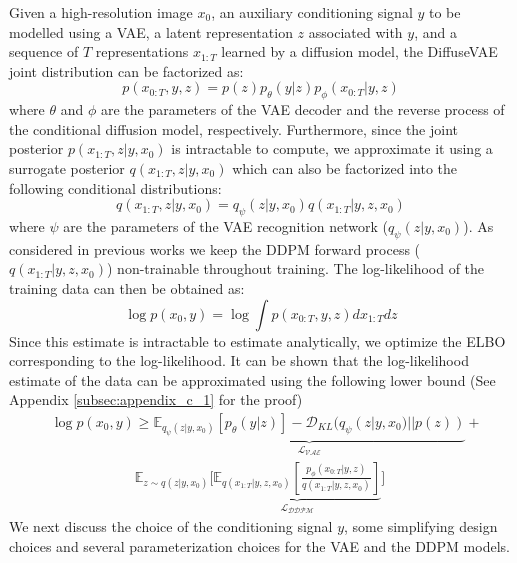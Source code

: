 \documentclass[10pt]{article} \usepackage[accepted]{tmlr}
\begin{document}
Given a high-resolution image $x_0$, an auxiliary conditioning signal $y$ to be modelled using a VAE, a latent representation $z$ associated with $y$, and a sequence of $T$ representations $x_{1:T}$ learned by a diffusion model, the DiffuseVAE joint distribution can be factorized as:
\begin{equation}
    p(x_{0:T}, y, z) = p(z)p_{\theta}(y|z)p_{\phi}(x_{0:T}|y, z)
\end{equation}
where $\theta$ and $\phi$ are the parameters of the VAE decoder and the reverse process of the conditional diffusion model, respectively.
Furthermore, since the joint posterior $p(x_{1:T}, z|y, x_0)$ is intractable to compute, we approximate it using a surrogate posterior $q(x_{1:T}, z|y, x_0)$ which can also be factorized into the following conditional distributions:
\begin{equation}
    q(x_{1:T}, z|y, x_0) = q_{\psi}(z|y, x_0)q(x_{1:T} | y, z, x_0)
\end{equation}
where $\psi$ are the parameters of the VAE recognition network ($q_{\psi}(z|y, x_0)$). As considered in previous works \citep{sohldickstein2015deep, ho2020denoising} we keep the DDPM forward process ($q(x_{1:T} | y, z, x_0)$) non-trainable throughout training. The log-likelihood of the training data can then be obtained as:
\begin{equation}
    \log{p(x_0, y)} = \log{\int p(x_{0:T}, y, z) dx_{1:T}dz}
\end{equation}
Since this estimate is intractable to estimate analytically, we optimize the ELBO corresponding to the log-likelihood. It can be shown that the log-likelihood estimate of the data can be approximated using the following lower bound (See Appendix \ref{subsec:appendix_c_1} for the proof)
\begin{equation}
\begin{split}
    &\log{p(x_0, y)} \geq \underbrace{\mathbb{E}_{q_{\psi}(z|y, x_0)}[p_{\theta}(y|z)] - \mathcal{D}_{KL}(q_{\psi}(z|y, x_0) || p(z))}_\mathcal{L_{\text{VAE}}} + \\
      & \qquad\qquad\qquad\mathbb{E}_{z\sim q(z|y,x_0)}\Bigg[\underbrace{\mathbb{E}_{q(x_{1:T}|y, z, x_0)}\left[\frac{p_{\phi}(x_{0:T}|y, z)}{q(x_{1:T} | y, z, x_0)}\right]}_\mathcal{L_{\text{DDPM}}}\Bigg]
\end{split}
\label{eqn:elbo}
\end{equation}
We next discuss the choice of the conditioning signal $y$, some simplifying design choices and several parameterization choices for the VAE and the DDPM models.
\end{document}

